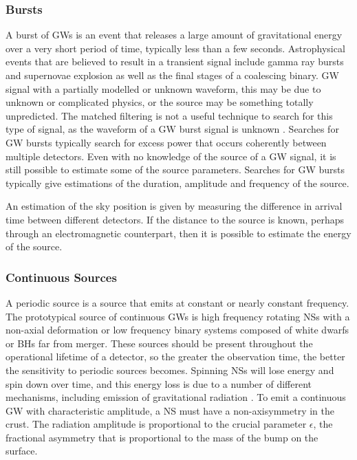 \documentclass[binding=0.6cm, LaM]{sapthesis}
\begin{document}
\subsubsection{Bursts}
	A burst of GWs is an event that releases a large amount 
	of gravitational energy over a very short period of time, typically less than a few seconds.  
	Astrophysical events that are believed to result in a transient signal 
	include gamma ray bursts and supernovae explosion as well as the final stages of a coalescing binary. 
	GW signal with a partially modelled or unknown waveform, 
	this may be due to unknown or complicated physics, or the source may be something totally unpredicted. 
	The matched filtering is not a useful technique to search for this type of signal, 
	as the waveform of a GW burst signal is unknown \cite{3}. 
	Searches for GW bursts typically search for excess power that occurs coherently between multiple detectors.  
	Even with no knowledge of the source of a GW signal, 
	it is still possible to estimate some of the source parameters. 
	Searches for GW bursts typically give estimations of the duration, 
	amplitude and frequency of the source.

	An estimation of the sky position is given by measuring the difference 
	in arrival time between different detectors. 
	If the distance to the source is known, 
	perhaps through an electromagnetic counterpart, 
	then it is possible to estimate the energy of the source. 

\subsubsection{Continuous Sources}
	A periodic source is a source that emits at constant or nearly constant frequency.
	The prototypical source of continuous GWs is high frequency rotating NSs 
	with a non-axial deformation or low frequency binary systems 
	composed of white dwarfs or BHs far from merger. 
	These sources should be present throughout the operational lifetime of a detector, 
	so the greater the observation time, the better the sensitivity to periodic sources becomes. 
	Spinning NSs will lose energy and spin down over time, 
	and this energy loss is due to a number of different mechanisms, 
	including emission of gravitational radiation \cite{3}. 
	To emit a continuous GW with characteristic amplitude, 
	a NS must have a non-axisymmetry in the crust. 
	The radiation amplitude is proportional to the crucial parameter $\epsilon$, 
	the fractional asymmetry that is proportional to the mass of the bump on the surface.
\end{document}
